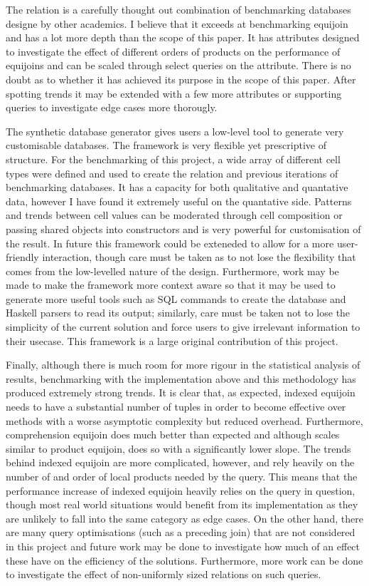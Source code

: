 The  relation is a carefully thought out combination of
benchmarking databases designe by other academics. I
believe that it exceeds at benchmarking equijoin and has a lot more depth than
the scope of this paper. It has attributes designed to investigate the effect of
different orders of products on the performance of equijoins and can be scaled
through select queries on the  attribute. There is no
doubt as to whether it has achieved its purpose in the scope of this paper.
After spotting trends it may be extended with a few more attributes or
supporting queries to investigate edge cases more thorougly.

The synthetic database generator gives users a low-level tool to generate very
customisable databases. The framework is very flexible yet prescriptive of
structure. For the benchmarking of this project, a wide array of different cell
types were defined and used to create the  relation and
previous iterations of benchmarking databases. It has a capacity for both
qualitative and quantative data, however I have found it extremely useful on the
quantative side. Patterns and trends between cell values can be moderated
through cell composition or passing shared objects into constructors and is very
powerful for customisation of the result. In future this framework could be
exteneded to allow for a more user-friendly interaction, though care must be
taken as to not lose the flexibility that comes from the low-levelled nature of
the design. Furthermore, work may be made to make the framework more context
aware so that it may be used to generate more useful tools such as SQL commands
to create the database and Haskell parsers to read its output; similarly, care
must be taken not to lose the simplicity of the current solution and force users
to give irrelevant information to their usecase. This framework is a large
original contribution of this project.

Finally, although there is much room for more rigour in the statistical analysis
of results, benchmarking with the implementation above and this methodology has
produced extremely strong trends. It is clear that, as expected, indexed
equijoin needs to have a substantial number of tuples in order to become
effective over methods with a worse asymptotic complexity but reduced overhead.
Furthermore, comprehension equijoin does much better than expected and although
scales similar to product equijoin, does so with a significantly lower slope.
The trends behind indexed equijoin are more complicated, however, and rely
heavily on the number of and order of local products needed by the query. This
means that the performance increase of indexed equijoin heavily relies on the
query in question, though most real world situations would benefit from its
implementation as they are unlikely to fall into the same category as edge
cases. On the other hand, there are many query optimisations (such as a
preceding join) that are not considered in this project and future work may be
done to investigate how much of an effect these have on the efficiency of the
solutions. Furthermore, more work can be done to investigate the effect of
non-uniformly sized relations on such queries.

